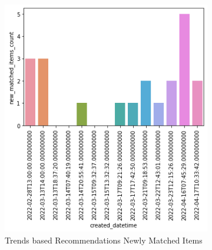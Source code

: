 \documentclass[manuscript,natbib=false, anonymous]{acmart}
\begin{document}
\begin{figure}[h]
     \centering
     \begin{subfigure}[b]{0.47\linewidth}
         \centering
         \includegraphics[width=\linewidth]{images/new_matched_items_per_day.png}
         \caption{Trends based Recommendations Newly Matched Items}
         \label{fig:trends-recsys-trends-new-matches}
     \end{subfigure}
     \hfill
     \begin{subfigure}[b]{0.47\linewidth}
         \centering

\end{subfigure}
\end{figure}
\end{document}
